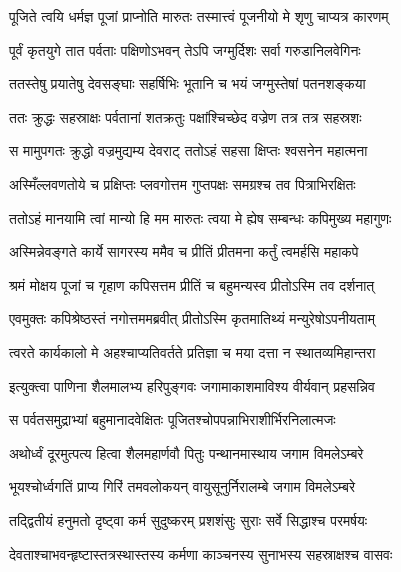 \twolineshloka
{पूजिते त्वयि धर्मज्ञ पूजां प्राप्नोति मारुतः}
{तस्मात्त्वं पूजनीयो मे शृणु चाप्यत्र कारणम्} %

\twolineshloka
{पूर्वं कृतयुगे तात पर्वताः पक्षिणोऽभवन्}
{तेऽपि जग्मुर्दिशः सर्वा गरुडानिलवेगिनः} %

\twolineshloka
{ततस्तेषु प्रयातेषु देवसङ्घाः सहर्षिभिः}
{भूतानि च भयं जग्मुस्तेषां पतनशङ्कया} %

\twolineshloka
{ततः क्रुद्धः सहस्राक्षः पर्वतानां शतक्रतुः}
{पक्षांश्चिच्छेद वज्रेण तत्र तत्र सहस्रशः} %

\twolineshloka
{स मामुपगतः क्रुद्धो वज्रमुद्यम्य देवराट्}
{ततोऽहं सहसा क्षिप्तः श्वसनेन महात्मना} %

\twolineshloka
{अस्मिँल्लवणतोये च प्रक्षिप्तः प्लवगोत्तम}
{गुप्तपक्षः समग्रश्च तव पित्राभिरक्षितः} %

\twolineshloka
{ततोऽहं मानयामि त्वां मान्यो हि मम मारुतः}
{त्वया मे ह्येष सम्बन्धः कपिमुख्य महागुणः} %

\twolineshloka
{अस्मिन्नेवङ्गते कार्ये सागरस्य ममैव च}
{प्रीतिं प्रीतमना कर्तुं त्वमर्हसि महाकपे} %

\twolineshloka
{श्रमं मोक्षय पूजां च गृहाण कपिसत्तम}
{प्रीतिं च बहुमन्यस्व प्रीतोऽस्मि तव दर्शनात्} %

\twolineshloka
{एवमुक्तः कपिश्रेष्ठस्तं नगोत्तममब्रवीत्}
{प्रीतोऽस्मि कृतमातिथ्यं मन्युरेषोऽपनीयताम्} %

\twolineshloka
{त्वरते कार्यकालो मे अहश्चाप्यतिवर्तते}
{प्रतिज्ञा च मया दत्ता न स्थातव्यमिहान्तरा} %

\twolineshloka
{इत्युक्त्वा पाणिना शैलमालभ्य हरिपुङ्गवः}
{जगामाकाशमाविश्य वीर्यवान् प्रहसन्निव} %

\twolineshloka
{स पर्वतसमुद्राभ्यां बहुमानादवेक्षितः}
{पूजितश्चोपपन्नाभिराशीर्भिरनिलात्मजः} %

\twolineshloka
{अथोर्ध्वं दूरमुत्पत्य हित्वा शैलमहार्णवौ}
{पितुः पन्थानमास्थाय जगाम विमलेऽम्बरे} %

\twolineshloka
{भूयश्चोर्ध्वगतिं प्राप्य गिरिं तमवलोकयन्}
{वायुसूनुर्निरालम्बे जगाम विमलेऽम्बरे} %

\twolineshloka
{तद्द्वितीयं हनुमतो दृष्ट्वा कर्म सुदुष्करम्}
{प्रशशंसुः सुराः सर्वे सिद्धाश्च परमर्षयः} %

\twolineshloka
{देवताश्चाभवन्हृष्टास्तत्रस्थास्तस्य कर्मणा}
{काञ्चनस्य सुनाभस्य सहस्राक्षश्च वासवः} %

